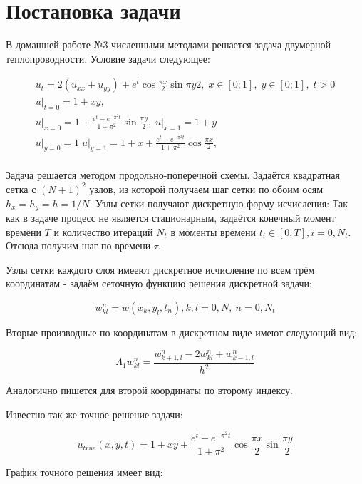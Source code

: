 \section{Постановка задачи}

В домашней работе №3 численными методами решается задача двумерной теплопроводности.
Условие задачи следующее:

\begin{equation}
\begin{array}{l}
u_t = 2 ( u_{xx} + u_{yy}) + e^t \cos{\frac{\pi x}{2} \sin{\pi y}{2}}, \; x \in [0;1], \; y \in [0;1], \; t > 0 \\
\left.u\right|_{t = 0} = 1 + xy, \\ 
\left.u\right|_{x = 0} = 1 + \frac{e^t - e^{-\pi^2t}}{1+\pi^2} \sin{\frac{\pi y}{2}}, \; \left.u\right|_{x = 1} = 1 + y \\
\left.u\right|_{y = 0} = 1 \; \left.u\right|_{y = 1} = 1 + x + \frac{e^t - e^{-\pi^2t}}{1+\pi^2} \cos{\frac{\pi x}{2}}, \\
\label{eq:task}
\end{array}
\end{equation}


Задача решается методом продольно-поперечной схемы.
Задаётся квадратная сетка с $(N+1)^2$ узлов, из которой получаем шаг сетки по обоим осям $h_x = h_y = h = 1/N$.
Узлы сетки получают дискретную форму исчисления:
Так как в задаче процесс не является стационарным, задаётся конечный момент времени $T$ и количество итераций $N_t$ в моменты времени $t_i \in [0,T], i = \overline{0,N_t}$. Отсюда получим шаг по времени $\tau$.

Узлы сетки каждого слоя имееют дискретное исчисление по всем трём координатам - задаём сеточную функцию решения дискретной задачи:

\[ w_{kl}^n = w(x_k, y_l, t_n), k,l = \overline{0,N},\ n = \overline{0,N_t} \]

Вторые производные по координатам в дискретном виде имеют следующий вид:

\[\Lambda_1  w_{kl}^n = \frac{w_{k+1,l}^n - 2 w_{kl}^n + w_{k-1,l}^n}{h^2} \]

Аналогично пишется для второй координаты по второму индексу.

Известно так же точное решение задачи:

\[ u_{true}(x,y,t) =  1 + xy + \frac{e^t - e^{-\pi^2t}}{1+\pi^2} \cos{\frac{\pi x}{2}} \sin{\frac{\pi y}{2}} \]

График точного решения имеет вид:

